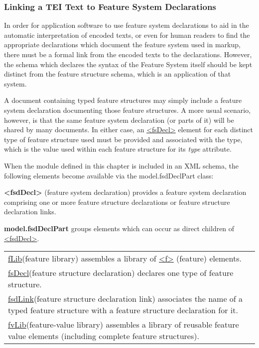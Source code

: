 \subsubsection[{Linking a TEI Text to Feature System Declarations}]{Linking a TEI Text to Feature System Declarations}\label{FDLK}\par
In order for application software to use feature system declarations to aid in the automatic interpretation of encoded texts, or even for human readers to find the appropriate declarations which document the feature system used in markup, there must be a formal link from the encoded texts to the declarations. However, the schema which declares the syntax of the Feature System itself should be kept distinct from the feature structure schema, which is an application of that system.\par
A document containing typed feature structures may simply include a feature system declaration documenting those feature structures. A more usual scenario, however, is that the same feature system declaration (or parts of it) will be shared by many documents. In either case, an \hyperref[TEI.fsDecl]{<fsDecl>} element for each distinct type of feature structure used must be provided and associated with the type, which is the value used within each feature structure for its {\itshape type} attribute.\par
When the module defined in this chapter is included in an XML schema, the following elements become available via the \textsf{model.fsdDeclPart} class: 
\begin{sansreflist}
  
\item [\textbf{<fsdDecl>}] (feature system declaration) provides a feature system declaration comprising one or more feature structure declarations or feature structure declaration links.
\item [\textbf{model.fsdDeclPart}] groups elements which can occur as direct children of \hyperref[TEI.fsdDecl]{<fsdDecl>}. \par 
\begin{longtable}{P{0.18521400778210118\textwidth}P{0.6647859922178988\textwidth}}
\hyperref[TEI.fLib]{fLib}\tabcellsep (feature library) assembles a library of \hyperref[TEI.f]{<f>} (feature) elements.\\
\hyperref[TEI.fsDecl]{fsDecl}\tabcellsep (feature structure declaration) declares one type of feature structure.\\
\hyperref[TEI.fsdLink]{fsdLink}\tabcellsep (feature structure declaration link) associates the name of a typed feature structure with a feature structure declaration for it.\\
\hyperref[TEI.fvLib]{fvLib}\tabcellsep (feature-value library) assembles a library of reusable feature value elements (including complete feature structures).\end{longtable} \par
 
\end{sansreflist}
